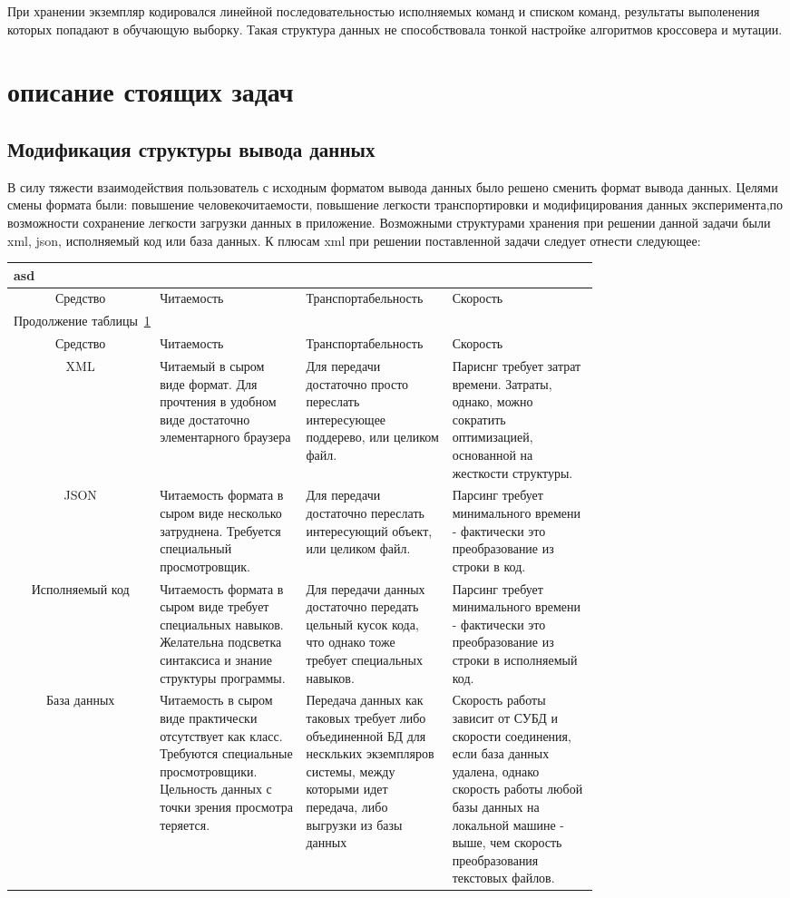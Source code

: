 \documentclass[utf8,usehyperref,12pt]{G7-32}
\begin{document}
При хранении экземпляр кодировался линейной последовательностью исполняемых команд и списком команд, результаты выполенения которых попадают в обучающую выборку. Такая структура данных не способствовала тонкой настройке алгоритмов кроссовера и мутации.
\section{описание стоящих задач}
\subsection{Модификация структуры вывода данных}
В силу тяжести взаимодействия пользователь с исходным форматом вывода данных было решено сменить формат вывода данных. Целями смены формата были: повышение человекочитаемости, повышение легкости транспортировки и модифицирования данных эксперимента,по возможности сохранение легкости загрузки данных в приложение.
Возможными структурами хранения при решении данной задачи были xml, json, исполняемый код или база данных. К плюсам xml при решении поставленной задачи следует отнести следующее:
\begin{longtable}{|c|p{0.25\linewidth}|p{0.25\linewidth}|p{0.25\linewidth}|}
\multicolumn{4}{l}{\tablename asd\label{T:Ta}}\\
\hline
Средство & Читаемость & Транспортабельность & Скорость \\
\hline
\endfirsthead
\multicolumn{4}{l}{Продолжение таблицы~\ref{T:Ta}}\\
\hline
Средство & Читаемость & Транспортабельность & Скорость \\
\hline
\endhead
XML & Читаемый в сыром виде формат. Для прочтения в удобном виде достаточно элементарного браузера & Для передачи достаточно просто переслать интересующее поддерево, или целиком файл. & Париснг требует затрат времени. Затраты, однако, можно сократить оптимизацией, основанной на жесткости структуры.   \\
JSON & Читаемость формата в сыром виде несколько затруднена. Требуется специальный просмотровщик. & Для передачи достаточно переслать интересующий объект, или целиком файл. & Парсинг требует минимального времени - фактически это преобразование из строки в код. \\
Исполняемый код & Читаемость формата в сыром виде требует специальных навыков. Желательна подсветка синтаксиса и знание структуры программы. & Для передачи данных достаточно передать цельный кусок кода, что однако тоже требует специальных навыков. & Парсинг требует минимального времени - фактически это преобразование из строки в исполняемый код. \\
База данных &
Читаемость в сыром виде практически отсутствует как класс. Требуются специальные просмотровщики. Цельность данных с точки зрения просмотра теряется. &
Передача данных как таковых требует либо объединенной БД для нескльких экземпляров системы, между которыми идет передача, либо выгрузки из базы данных &
Скорость работы зависит от СУБД и скорости соединения, если база данных удалена, однако скорость работы любой базы данных на локальной машине - выше, чем скорость преобразования текстовых файлов. \\
\hline
\end{longtable}
\end{document}
